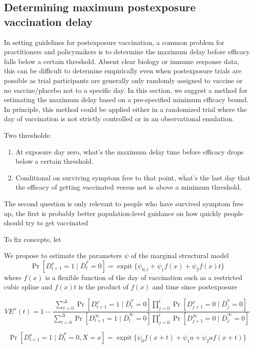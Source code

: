 \documentclass[11pt]{article}
\begin{document}
\begin{appendix}
    \subsection{Determining maximum postexposure vaccination delay}
    In setting guidelines for postexposure vaccination, a common problem for practitioners and policymakers is to determine the maximum delay before efficacy falls below a certain threshold. Absent clear biology or immune response data, this can be difficult to determine empirically even when postexposure trials are possible as trial participants are generally only randomly assigned to vaccine or no vaccine/placebo not to a specific day. In this section, we suggest a method for estimating the maximum delay based on a pre-specified minimum efficacy bound. In principle, this method could be applied either in a randomized trial where the day of vaccination is not strictly controlled or in an observational emulation. 
 
    Two thresholds:
    \begin{enumerate}
        \item At exposure day zero, what's the maximum delay time before efficacy drops below a certain threshold.
        \item Conditional on surviving symptom free to that point, what's the last day that the efficacy of getting vaccinated versus not is above a minimum threshold.
    \end{enumerate}
    The second question is only relevant to people who have survived symptom free up, the first is probably better population-level guidance on how quickly people should try to get vaccinated 

    To fix concepts, let 

    We propose to estimate the parameters $\psi$ of the marginal structural model 
    $$\Pr[D^{x}_{t+1} = 1 \mid \overline{D}^x_t = 0] =  \operatorname{expit}\{\psi_{0,t} + \psi_1 f(x) + \psi_2 f(x) t\}$$
    where $f(x)$ is a flexible function of the day of vaccination such as a restricted cubic spline and $f(x)t$ is the product of $f(x)$ and time since postexposure
    
    $$VE^x(t) = 1 - \frac{\sum_{t=0}^\Delta \Pr[D^{x}_{t+1} = 1 \mid \overline{D}^x_t = 0] \prod_{j=0}^t\Pr[D^{x}_{j+1} = 0 \mid \overline{D}^x_j = 0]}{\sum_{t=0}^\Delta \Pr[D^{\infty}_{t+1} = 1 \mid \overline{D}^\infty_t = 0] \prod_{j=0}^t\Pr[D^{\infty}_{j+1} = 0 \mid \overline{D}^\infty_j = 0]}$$

    $$\Pr[D^{a}_{t+1} = 1 \mid \overline{D}^a_t = 0, X = x] =  \operatorname{expit}\{\psi_{0}f(x + t) + \psi_1 a + \psi_2 a f(x + t) \}$$


\end{appendix}
\end{document}
